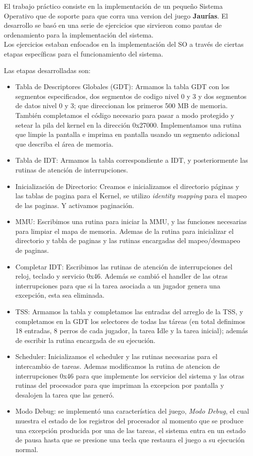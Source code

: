 \indent El trabajo práctico consiste en la implementación de un pequeño Sistema Operativo que de soporte
para que corra una version del juego \textbf{Jaurías}. El desarrollo se basó en una serie de ejercicios que
sirvieron como pautas de ordenamiento para la implementación del sistema. \\
Los ejercicios estaban enfocados en la implementación del SO a través de ciertas etapas específicas
para el funcionamiento del sistema.

Las etapas desarrolladas son:

\begin{itemize}
	\item Tabla de Descriptores Globales (GDT): Armamos la tabla GDT con los segmentos especificados,
dos segmentos de codigo nivel 0 y 3 y dos segmentos de datos nivel 0 y 3; que direccionan
los primeros 500 MB de memoria. También completamos el código necesario para pasar a modo
protegido y setear la pila del kernel en la dirección 0x27000. Implementamos una rutina que
limpie la pantalla e imprima en pantalla usando un segmento adicional que describa el área de
memoria.
	\item Tabla de IDT: Armamos la tabla correspondiente a IDT, y posteriormente las rutinas de atención
de interrupciones.
	\item Inicialización de Directorio: Creamos e inicializamos el directorio páginas y las tablas de pagina
para el Kernel, se utilizo \textit{identity mapping} para el mapeo de las paginas. Y activamos paginación.
	\item MMU: Escribimos una rutina para iniciar la MMU, y las funciones necesarias para limpiar el mapa
de memoria. Ademas de la rutina para inicializar el directorio y tabla de paginas y las rutinas
encargadas del mapeo/desmapeo de paginas.
	\item Completar IDT: Escribimos las rutinas de atención de interrupciones del reloj, teclado y servicio
0x46. Además se cambió el handler de las otras interrupciones para que si la tarea asociada
a un jugador genera una excepción, esta sea eliminada.
	\item TSS: Armamos la tabla y completamos las entradas del arreglo de la TSS, y completamos en la
GDT los selectores de todas las táreas (en total definimos 18 entradas, 8 perros de cada jugador, la tarea Idle y la tarea inicial); además de escribir la rutina
encargada de su ejecución.
	\item Scheduler: Inicializamos el scheduler y las rutinas necesarias para el intercambio de tareas. Ademas modificamos la rutina de atencion de interrupciones 0x46 para que implemente los servicios
del sistema y las otras rutinas del procesador para que impriman la excepcion por pantalla y
desalojen la tarea que las generó.
	\item Modo Debug: se implementó una característica del juego, \textit{Modo Debug}, el cual muestra el estado de los registros del procesador al momento que se produce una excepción producida por una de las tareas, el sistema entra en un estado de pausa hasta que se presione una tecla que restaura el juego a su ejecución normal.
\end{itemize}